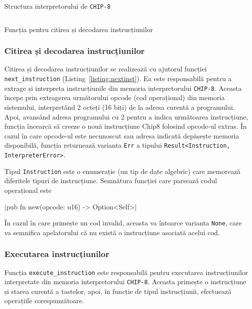\documentclass[a4paper]{article}
\begin{document}
\begin{listing}[hbt!]
	\begin{center}
		\inputminted{rust}{codeblocks/chip8.rs}
		\caption{Structura interpretorului de \texttt{CHIP-8}}\label{listing:chip8struct}
	\end{center}
\end{listing}

\begin{listing}[hbt!]
	\begin{center}
		\inputminted{rust}{codeblocks/next-instruction.rs}
		\caption{Funcția pentru citirea și decodarea instrucțiunilor}\label{listing:nextinst}
	\end{center}
\end{listing}

\subsubsection{Citirea și decodarea instrucțiunilor}
Citirea și decodarea instrucțiunilor se realizează cu ajutorul funcției \verb|next_instruction| (Listing~\ref{listing:nextinst}).
Ea este responsabilă pentru a extrage și interpreta instrucțiunile din memoria interpretorului \texttt{CHIP-8}. Aceasta începe
prin extragerea următorului opcode (cod operațional) din memoria sistemului, interpretând 2 octeți (16 biți) de la adresa curentă a programului.
Apoi, avansând adresa programului cu 2 pentru a indica următoarea instrucțiune, funcția încearcă să creeze o nouă instrucțiune Chip8 folosind
opcode-ul extras. În cazul în care opcode-ul este necunoscut sau adresa indicată depășește memoria disponibilă, funcția returnează varianta
\texttt{Err} a tipului \verb|Result<Instruction, InterpreterError>|.

Tipul \texttt{Instruction} este o enumerație (un tip de date algebric) care memorează diferitele tipuri de instrucțiune. Semnătura funcției
care parsează codul operațional este

|pub fn new(opcode: u16) -> Option<Self>|

În cazul în care primește un cod invalid, aceasta va întoarce varianta \verb|None|, care va semnifica apelatorului că nu există o instrucțiune
asociată acelui cod.

\subsubsection{Executarea instrucțiunilor}
Funcția \verb|execute_instruction| este responsabilă pentru executarea instrucțiunilor interpretate din memoria interpretorului \texttt{CHIP-8}.
Aceasta primește o instrucțiune și starea curentă a tastelor, apoi, în funcție de tipul instrucțiunii, efectuează operațiile corespunzătoare.
\end{document}
